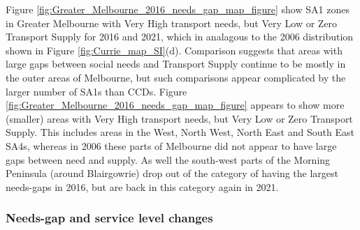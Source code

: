\documentclass[preprint, 3p,
authoryear]{elsarticle} %
\begin{document}
Figure \ref{fig:Greater_Melbourne_2016_needs_gap_map_figure} show SA1
zones in Greater Melbourne with Very High transport needs, but Very Low
or Zero Transport Supply for 2016 and 2021, which in analagous to the
2006 distribution shown in Figure \ref{fig:Currie_map_SI}(d). Comparison
suggests that areas with large gaps between social needs and Transport
Supply continue to be mostly in the outer areas of Melbourne, but such
comparisons appear complicated by the larger number of SA1s than CCDs.
Figure \ref{fig:Greater_Melbourne_2016_needs_gap_map_figure} appears to
show more (smaller) areas with Very High transport needs, but Very Low
or Zero Transport Supply. This includes areas in the West, North West,
North East and South East SA4s, whereas in 2006 these parts of Melbourne
did not appear to have large gaps between need and supply. As well the
south-west parts of the Morning Peninsula (around Blairgowrie) drop out
of the category of having the largest needs-gaps in 2016, but are back
in this category again in 2021.

\subsubsection{Needs-gap and service level
changes}\label{needs-gap-and-service-level-changes}
\end{document}
